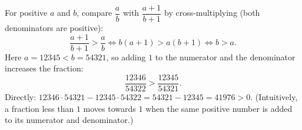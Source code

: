 For positive $a$ and $b$, compare $\dfrac {a}{b}$ with $\dfrac{a+1}{b+1}$ by cross-multiplying (both denominators are positive):
\[
\dfrac{a+1}{b+1}>\dfrac {a}{b}\iff b(a+1)>a(b+1)\iff b>a .
\]
Here $a=12345<b=54321$, so adding $1$ to the numerator and the denominator increases the fraction:
\[
\boxed{\dfrac{12346}{54322}>\dfrac{12345}{54321}}.
\]
Directly: $12346\cdot54321-12345\cdot54322=54321-12345=41976>0$. (Intuitively, a fraction less than $1$ moves towards $1$ when the same positive number is added to its numerator and denominator.)
